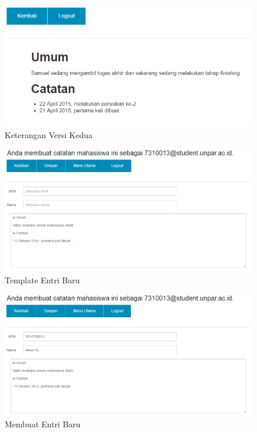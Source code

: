 \begin{figure}[H]
\centering
\includegraphics[scale=0.75]{Gambar/pengujian13.png}
\caption[Keterangan Versi Kedua]{Keterangan Versi Kedua} 
\label{fig:keteranganversikedua}
\end{figure}

\begin{figure}[H]
\centering
\includegraphics[scale=0.6]{Gambar/pengujian14.png}
\caption[Template Entri Baru]{Template Entri Baru} 
\label{fig:templateentribaru}
\end{figure}

\begin{figure}[H]
\centering
\includegraphics[scale=0.6]{Gambar/pengujian15.png}
\caption[Membuat Entri Baru]{Membuat Entri Baru} 
\label{fig:membuatentribaru}
\end{figure}

